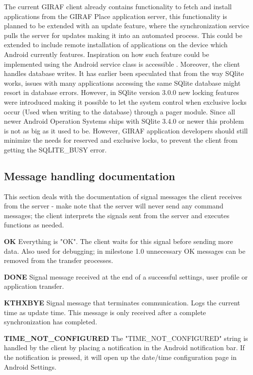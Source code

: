 The current GIRAF client already contains functionality to fetch and install applications from the GIRAF Place application server, this functionality is planned to be extended with an update feature, where the synchronization service pulls the server for updates making it into an automated process. This could be extended to include remote installation of applications on the device which Android currently features. Inspiration on how such feature could be implemented using the Android service class is accessible \cite{DevRemote}. Moreover, the client handles database writes. It has earlier been speculated that from the way SQlite works, issues with many applications accessing the same SQlite database might resort in database errors. However, in SQlite version 3.0.0 new locking features were introduced making it possible to let the system control when exclusive locks occur (Used when writing to the database) through a pager module\cite{SQlite}. Since all newer Android Operation Systems ships with SQlite 3.4.0 or newer\cite{AndDevel} this problem is not as big as it used to be. However, GIRAF application developers should still minimize the needs for reserved and exclusive locks, to prevent the client from getting the SQLITE\_BUSY error.   

\subsection{Message handling documentation}
This section deals with the documentation of signal messages the client receives from the server - make note that the server will never send any command messages; the client interprets the signals sent from the server and executes functions as needed.   

\textbf{OK}
Everything is "OK". The client waits for this signal before sending more data. Also used for debugging; in milestone 1.0 unnecessary OK messages can be removed from the transfer processes. 

\textbf{DONE}
Signal message received at the end of a successful settings, user profile or application transfer. 

\textbf{KTHXBYE}
Signal message that terminates communication. Logs the current time as update time. This message is only received after a complete synchronization has completed.  
  
 
\textbf{TIME\_NOT\_CONFIGURED}
The "TIME\_NOT\_CONFIGURED" string is handled by the client by placing a notification in the Android notification bar. If the notification is pressed, it will open up the date/time configuration page in Android Settings.

